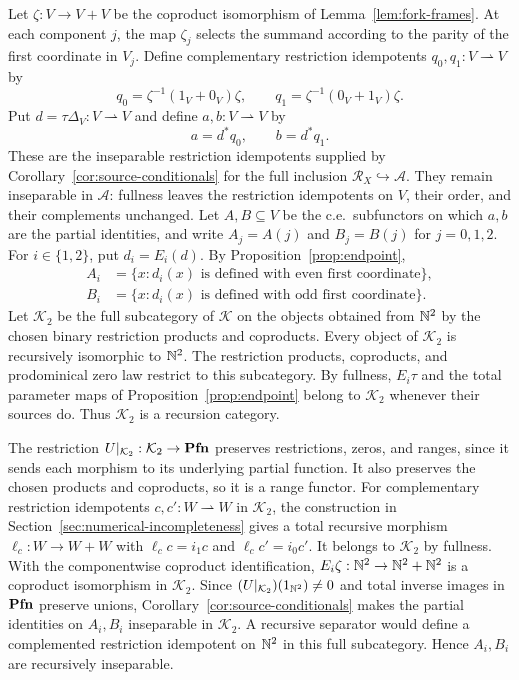 Let $\zeta:V\to V+V$ be the coproduct isomorphism of
Lemma~\ref{lem:fork-frames}. At each component $j$, the map
$\zeta_j$ selects the summand according to the parity of the
first coordinate in $V_j$. Define complementary restriction idempotents
$q_0,q_1:V\rightharpoonup V$ by
\[
 q_0=\zeta^{-1}(1_V+0_V)\zeta,\qquad
 q_1=\zeta^{-1}(0_V+1_V)\zeta.
\]
Put $d=\tau\Delta_V:V\rightharpoonup V$ and define
$a,b:V\rightharpoonup V$ by
\[
 a=d^*q_0,\qquad b=d^*q_1.
\]
These are the inseparable restriction idempotents supplied by
Corollary~\ref{cor:source-conditionals} for the full inclusion
$\mathscr R_X\hookrightarrow\mathcal A$. They remain inseparable
in $\mathcal A$: fullness leaves the restriction idempotents on $V$, their order,
and their complements unchanged.
Let $A,B\subseteq V$ be the c.e.\ subfunctors on which $a,b$
are the partial identities, and write $A_j=A(j)$ and $B_j=B(j)$
for $j=0,1,2$. For $i\in\{1,2\}$, put $d_i=E_i(d)$.
By Proposition~\ref{prop:endpoint},
\begin{align*}
 A_i&=\{x:d_i(x)\text{ is defined with even first coordinate}\},\\
 B_i&=\{x:d_i(x)\text{ is defined with odd first coordinate}\}.
\end{align*}
Let $\mathcal K_2$ be the full subcategory of $\mathcal K$ on the
objects obtained from $\mathbb N^2$ by the chosen binary restriction
products and coproducts. Every object of $\mathcal K_2$ is recursively
isomorphic to $\mathbb N^2$. The restriction products, coproducts, and
prodominical zero law restrict to this subcategory. By fullness,
$E_i\tau$ and the total parameter maps of
Proposition~\ref{prop:endpoint} belong to $\mathcal K_2$ whenever
their sources do. Thus $\mathcal K_2$ is a recursion category.

The restriction $U|_{\mathcal K_2}:\mathcal K_2\to\mathbf{Pfn}$ preserves
restrictions, zeros, and ranges, since it sends each morphism to its
underlying partial function. It also preserves the chosen products
and coproducts, so it is a range functor.
For complementary restriction idempotents $c,c':W\rightharpoonup W$
in $\mathcal K_2$, the construction in
Section~\ref{sec:numerical-incompleteness} gives a total recursive
morphism $\ell_c:W\to W+W$ with
$\ell_cc=i_1c$ and $\ell_cc'=i_0c'$.
It belongs to $\mathcal K_2$ by fullness. With the componentwise coproduct
identification, $E_i\zeta:\mathbb N^2\to\mathbb N^2+\mathbb N^2$ is a coproduct
isomorphism in $\mathcal K_2$.
Since $(U|_{\mathcal K_2})(1_{\mathbb N^2})\ne0$ and total inverse
images in $\mathbf{Pfn}$ preserve unions,
Corollary~\ref{cor:source-conditionals} makes the partial identities
on $A_i,B_i$ inseparable in $\mathcal K_2$. A recursive separator
would define a complemented restriction idempotent on $\mathbb N^2$ in
this full subcategory. Hence $A_i,B_i$ are recursively inseparable.

